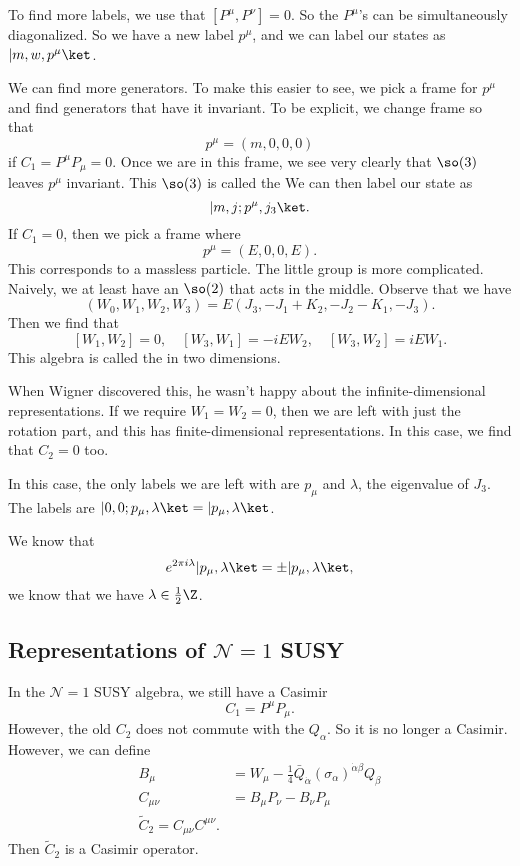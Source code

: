 \documentclass[a4paper]{article}
\begin{document}
To find more labels, we use that $[P^\mu, P^\nu] = 0$. So the $P^\mu$'s can be simultaneously diagonalized. So we have a new label $p^\mu$, and we can label our states as $|m, w, p^\mu\ket$.

We can find more generators. To make this easier to see, we pick a frame for $p^\mu$ and find generators that have it invariant. To be explicit, we change frame so that
\[
  p^\mu = (m, 0, 0, 0)
\]
if $C_1 = P^\mu P_\mu = 0$. Once we are in this frame, we see very clearly that $\so(3)$ leaves $p^\mu$ invariant. This $\so(3)$ is called the  We can then label our state as
\[
  |m, j; p^\mu, j_3\ket. %
\]
If $C_1 = 0$, then we pick a frame where
\[
  p^\mu = (E, 0, 0, E).
\]
This corresponds to a massless particle. The little group is more complicated. Naively, we at least have an $\so(2)$ that acts in the middle. Observe that we have
\[
  (W_0, W_1, W_2, W_3) = E(J_3, -J_1 + K_2, -J_2 - K_1, -J_3).
\]
Then we find that
\[
  [W_1, W_2] = 0,\quad [W_3, W_1] = - i E W_2,\quad [W_3, W_2] = i E W_1.
\]
This algebra is called the  in two dimensions. %

When Wigner discovered this, he wasn't happy about the infinite-dimensional representations. If we require $W_1 = W_2 = 0$, then we are left with just the rotation part, and this has finite-dimensional representations. In this case, we find that $C_2 = 0$ too.

In this case, the only labels we are left with are $p_\mu$ and $\lambda$, the eigenvalue of $J_3$. The labels are $|0, 0; p_\mu, \lambda\ket = |p_\mu, \lambda\ket$.

We know that
\[
  e^{2\pi i \lambda} |p_\mu, \lambda\ket = \pm |p_\mu, \lambda\ket,
\]
we know that we have $\lambda \in \frac{1}{2} \Z$. %

\subsection{Representations of \texorpdfstring{$\mathcal{N} = 1$}{N = 1} SUSY}
In the $\mathcal{N} = 1$ SUSY algebra, we still have a Casimir
\[
  C_1 = P^\mu P_\mu.
\]
However, the old $C_2$ does not commute with the $Q_\alpha$. So it is no longer a Casimir. However, we can define
\begin{align*}
  B_\mu &= W_\mu - \frac{1}{4} \bar{Q}_{\dot{\alpha}} (\sigma_\alpha)^{\dot{\alpha} \beta } Q_\beta\\
  C_{\mu\nu} &= B_\mu P_\nu - B_\nu P_\mu\\
  \tilde{C}_2 = C_{\mu\nu} C^{\mu\nu}.
\end{align*}
Then $\tilde{C}_2$ is a Casimir operator.
\end{document}
